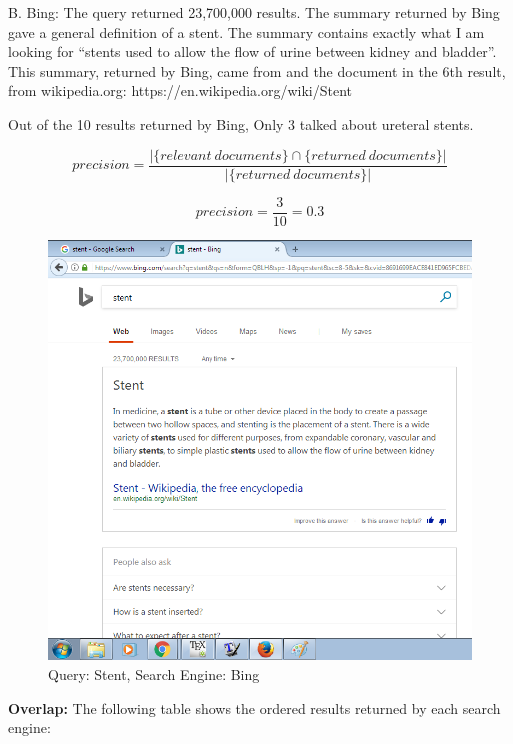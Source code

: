 \documentclass[a4paper, 11pt]{article}
\begin{document}
B. Bing:
The query returned 23,700,000 results. The summary returned by Bing gave a general definition of a stent. The summary contains exactly what I am looking for ``stents used to allow the flow of urine between kidney and bladder''. This summary, returned by Bing, came from and the document in the 6th result, from wikipedia.org:
https://en.wikipedia.org/wiki/Stent 

Out of the 10 results returned by Bing, Only 3 talked about ureteral stents.

$$ 
precision = \frac{|\{relevant\ documents\} \cap \{returned\ documents\}|}{|\{returned\ documents\}|}
$$

$$ 
precision = \frac{3}{10} = 0.3
$$

\pagebreak

\begin{figure}[h]
\caption{Query: Stent, Search Engine: Bing}
\centering
\includegraphics[scale=0.7]{Q1/stent_Bing.png}
\end{figure}

\textbf{Overlap:}
The following table shows the ordered results returned by each search engine: 
\end{document}
